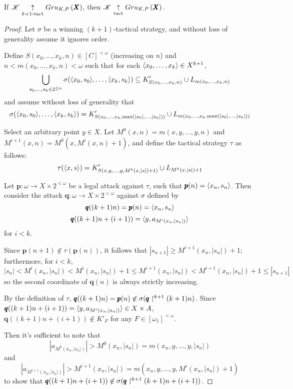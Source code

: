 \begin{lem}
  If $\mathscr{K}\underset{k+1\text{-tact}}{\uparrow}Gru_{K,P}\left({\pmb X}\right)$, then
  $\mathscr{K}\underset{\text{tact}}{\uparrow}Gru_{K,P}\left({\pmb X}\right)$.
\end{lem}

\begin{proof}
  Let $\sigma$ be a winning $(k+1)$-tactical strategy, and without loss of
  generality assume it ignores order.

  Define $S(x_0,\dots,x_{k},n)\in [C]^{<\omega}$ (increasing on $n$) and
  $n<m(x_0,\dots,x_{k},n)<\omega$ such that for each
  $\langle x_0,\dots,x_{k}\rangle\in X^{k+1}$,
  \[
    \bigcup_{s_0,\dots,s_k \in 2^{\leq n}}
    \sigma(\langle x_0,s_0\rangle,\dots,\langle x_{k},s_{k}\rangle)
      \subseteq
    K'_{S(x_0,\dots,x_{k},n)} \cup L_{m(x_0,\dots,x_{k},n)}
  \]
  and assume without loss of generality that
  \[
    \sigma(\langle x_0,s_0\rangle,\dots,\langle x_{k},s_{k}\rangle)
      =
    K'_{S(x_0,\dots,x_{k},\max(|s_0|,\dots,|s_k|))}
      \cup
    L_{m(x_0,\dots,x_{k},\max(|s_0|,\dots,|s_k|))}
  \]

  Select an arbitrary point $y \in X$.
  Let $M^0(x,n)=m(x,y,\dots,y,n)$ and $M^{i+1}(x,n)=M^0(x,M^i(x,n)+1)$, and
  define the tactical strategy $\tau$ as follows:
  \[
    \tau(\langle x,s\rangle)
      =
    K'_{S(x,y,\dots,y,M^k(x,|s|)+1)}
      \cup
    L_{M^k(x,|s|)+1}
  \]

  Let $\pmb p:\omega\to X\times 2^{<\omega}$ be a legal attack against
  $\tau$, such that $\pmb p(n)=\langle x_n,s_n\rangle$.
  Then consider the attack $\pmb q:\omega\to X\times 2^{<\omega}$ against
  $\sigma$ defined by
    \[
      \pmb q((k+1)n)=\pmb p(n)=\langle x_n,s_n\rangle
    \]
    \[
      \pmb q((k+1)n+(i+1))=\langle y, a_{M^i(x_n,|s_n|)}\rangle
    \]
  for $i<k$.

  Since $\pmb p(n+1)\not\in\tau(\pmb p(n))$, it follows that
  $|s_{n+1}|\geq M^{i+1}(x_n,|s_n|)+1$; furthermore, for $i<k$,
    \[
      |s_n|
        <
      M^i(x_n,|s_n|)
        <
      M^i(x_n,|s_n|)+1
        \leq
      M^{i+1}(x_n,|s_n|)
        <
      M^{i+1}(x_n,|s_n|)+1
        \leq
      |s_{n+1}|
    \]
  so the second coordinate of $\pmb q(n)$ is always strictly increasing.

  By the definition of $\tau$,
  $\pmb q((k+1)n)=\pmb p(n)\not\in\sigma(\pmb q\restriction^{k+1} (k+1)n)$.
  Since $\pmb q((k+1)n+(i+1))=\langle y, a_{M^i(x_n,|s_n|)}\rangle\in X\times A$,
  $\pmb q((k+1)n+(i+1))\not\in K'_F$ for any $F\in[\omega_1]^{<\omega}$.

  Then it's sufficient to note that
    \[
      |a_{M^0(x_n,|s_n|)}|
        >
      M^0(x_n,|s_n|)
        =
      m(x_n,y,\dots,y,|s_n|)
    \]
  and
    \[
      |a_{M^{i+1}(x_n,|s_n|)}|
        >
      M^{i+1}(x_n,|s_n|)
        =
      m(x_n,y,\dots,y,M^i(x_n,|s_n|)+1)
    \]
  to show that
  $\pmb q((k+1)n+(i+1))\not\in\sigma(\pmb q\restriction^{k+1} (k+1)n+(i+1))$.








\end{proof}
